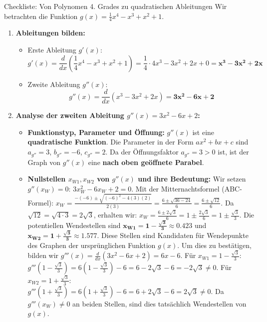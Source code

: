 \begin{loesungsumgebung}{Checkliste: Von Polynomen 4. Grades zu quadratischen Ableitungen}
Wir betrachten die Funktion $g(x) = \frac{1}{4}x^4 - x^3 + x^2 + 1$.

\begin{enumerate}[label=(\alph*)]
    \item \textbf{Ableitungen bilden:}
    \begin{itemize}
        \item Erste Ableitung $g'(x)$:
        $$ g'(x) = \frac{d}{dx}\left(\frac{1}{4}x^4 - x^3 + x^2 + 1\right) = \frac{1}{4} \cdot 4x^3 - 3x^2 + 2x + 0 = \mathbf{x^3 - 3x^2 + 2x} $$
        \item Zweite Ableitung $g''(x)$:
        $$ g''(x) = \frac{d}{dx}(x^3 - 3x^2 + 2x) = \mathbf{3x^2 - 6x + 2} $$
    \end{itemize}

    \item \textbf{Analyse der zweiten Ableitung $g''(x) = 3x^2 - 6x + 2$:}
    \begin{itemize}
        \item \textbf{Funktionstyp, Parameter und Öffnung:}
        $g''(x)$ ist eine \textbf{quadratische Funktion}.
        Die Parameter in der Form $ax^2+bx+c$ sind $a_{g''} = 3$, $b_{g''} = -6$, $c_{g''} = 2$.
        Da der Öffnungsfaktor $a_{g''} = 3 > 0$ ist, ist der Graph von $g''(x)$ eine \textbf{nach oben geöffnete Parabel}.
        \item \textbf{Nullstellen $x_{W1}, x_{W2}$ von $g''(x)$ und ihre Bedeutung:}
        Wir setzen $g''(x_W) = 0$: $3x_W^2 - 6x_W + 2 = 0$.
        Mit der Mitternachtsformel (ABC-Formel):
        $x_W = \frac{-(-6) \pm \sqrt{(-6)^2 - 4(3)(2)}}{2(3)} = \frac{6 \pm \sqrt{36 - 24}}{6} = \frac{6 \pm \sqrt{12}}{6}$.
        Da $\sqrt{12} = \sqrt{4 \cdot 3} = 2\sqrt{3}$, erhalten wir:
        $x_W = \frac{6 \pm 2\sqrt{3}}{6} = 1 \pm \frac{2\sqrt{3}}{6} = 1 \pm \frac{\sqrt{3}}{3}$.
        Die potentiellen Wendestellen sind $\mathbf{x_{W1} = 1 - \frac{\sqrt{3}}{3} \approx 0.423}$ und $\mathbf{x_{W2} = 1 + \frac{\sqrt{3}}{3} \approx 1.577}$.
        Diese Stellen sind Kandidaten für Wendepunkte des Graphen der ursprünglichen Funktion $g(x)$.
        Um dies zu bestätigen, bilden wir $g'''(x) = \frac{d}{dx}(3x^2 - 6x + 2) = 6x - 6$.
        Für $x_{W1} = 1 - \frac{\sqrt{3}}{3}$: $g'''(1 - \frac{\sqrt{3}}{3}) = 6(1 - \frac{\sqrt{3}}{3}) - 6 = 6 - 2\sqrt{3} - 6 = -2\sqrt{3} \neq 0$.
        Für $x_{W2} = 1 + \frac{\sqrt{3}}{3}$: $g'''(1 + \frac{\sqrt{3}}{3}) = 6(1 + \frac{\sqrt{3}}{3}) - 6 = 6 + 2\sqrt{3} - 6 = 2\sqrt{3} \neq 0$.
        Da $g'''(x_W) \neq 0$ an beiden Stellen, sind dies tatsächlich Wendestellen von $g(x)$.
    \end{itemize}


\end{enumerate}
\end{loesungsumgebung}
